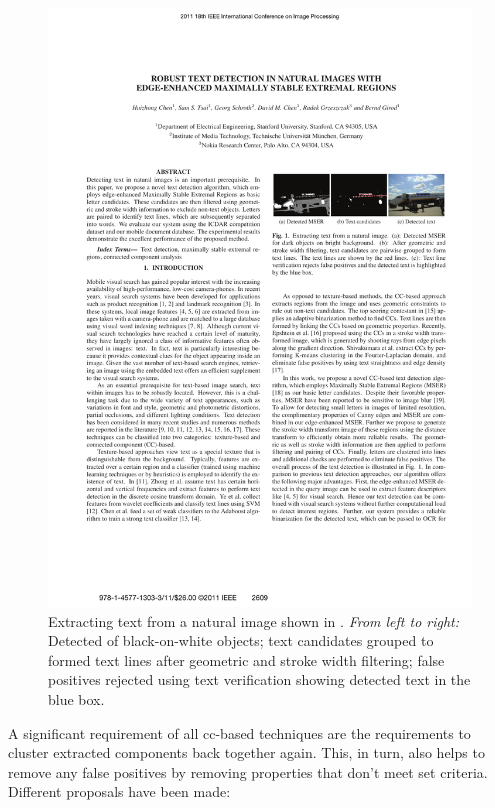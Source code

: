 \begin{figure}[tbh]
  \centering
  \includegraphics[width=\textwidth]{images/background/chen2011_mser}
  \caption[Using contrast-enhanced MSERs to detect text]{Extracting text from a natural image shown in \citet{Chen:2011ul}. \textit{From left to right:} Detected  of black-on-white objects; text candidates grouped to formed text lines after geometric and stroke width filtering; false positives rejected using text verification showing detected text in the blue box.}
  \label{fig:background:detection:cc:chen2011_mser}
\end{figure}

A significant requirement of all \gls{cc}-based techniques are the requirements to cluster extracted components back together again. This, in turn, also helps to remove any false positives by removing properties that don't meet set criteria. Different proposals have been made:


